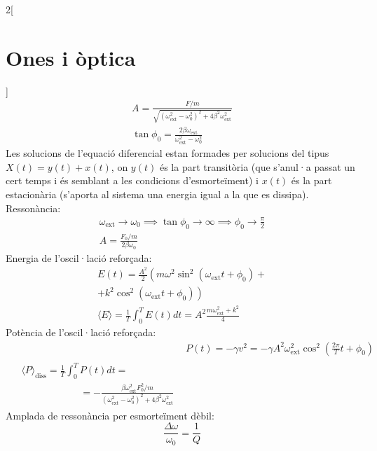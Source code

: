 \documentclass[../../../main.tex]{subfiles}
\begin{document}
\begin{multicols}{2}[\section{Ones i òptica}]
\begin{gather*}
    A=\frac{F/m}{\sqrt{(\omega_{\text{ext}}^2-\omega_0^2)^2+4\beta^2\omega_\text{ext}^2}}\\
    \tan\phi_0=\frac{2\beta\omega_{\text{ext}}}{\omega_{\text{ext}}^2-\omega_0^2}
  \end{gather*}
  {\footnotesize Les solucions de l'equació diferencial estan formades per solucions del tipus $X(t)=y(t)+x(t)$, on $y(t)$ és la part transitòria (que s'anul·a passat un cert temps i és semblant a les condicions d'esmorteïment) i $x(t)$ és la part estacionària (s'aporta al sistema una energia igual a la que es dissipa).}\newline
  Ressonància:
  \begin{gather*}
    \omega_{\text{ext}}\to\omega_0\implies\tan\phi_0\to\infty\implies\phi_0\to\frac{\pi}{2}\\
    A=\frac{F_0/m}{2\beta\omega_0}
  \end{gather*}
  Energia de l'oscil·lació reforçada:
  \begin{multline*}
    E(t)=\frac{A^2}{2}\left(m\omega^2\sin^2(\omega_{\text{ext}}t+\phi_0)+\right.\\\left.+k^2\cos^2(\omega_{\text{ext}}t+\phi_0)\right)\\
    \langle E\rangle=\frac{1}{T}\int_0^TE(t)dt=A^2\frac{m\omega_{\text{ext}}^2+k^2}{4}
  \end{multline*}
  Potència de l'oscil·lació reforçada:
  \begin{align*}
     & P(t)=-\gamma v^2=-\gamma A^2\omega_{\text{ext}}^2\cos^2\left(\frac{2\pi}{T}t+\phi_0\right) \\
    \begin{split}
      &\langle P\rangle_{\text{diss}}=\frac{1}{T}\int_0^TP(t)dt=\\&\qquad\qquad\qquad=-\frac{\beta\omega_\text{ext}^2F_0^2/m}{(\omega_\text{ext}^2-\omega_0^2)^2+4\beta^2\omega_\text{ext}^2}
    \end{split}
  \end{align*}
  Amplada de ressonància per esmorteïment dèbil:
  $$\frac{\Delta\omega}{\omega_0}=\frac{1}{Q}$$
  \begin{minipage}{\linewidth}
    \centering

\end{minipage}
\end{multicols}
\end{document}
